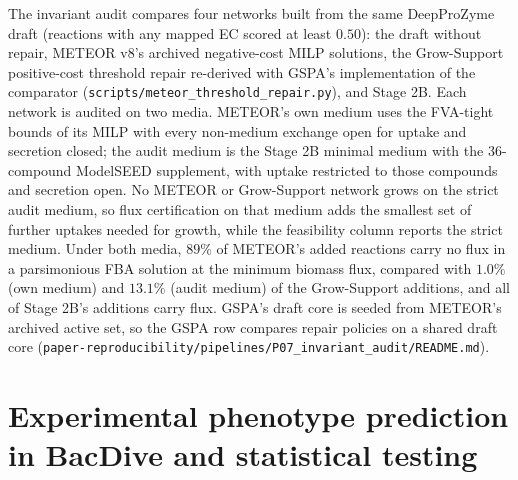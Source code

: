\documentclass[10pt]{article}
\newcommand{\fn}[1]{\nolinkurl{#1}}
\begin{document}
The invariant audit compares four networks built from the same DeepProZyme draft (reactions with any mapped EC scored at least $0.50$): the draft without repair, METEOR v8's archived negative-cost MILP solutions, the Grow-Support positive-cost threshold repair re-derived with GSPA's implementation of the comparator (\fn{scripts/meteor\_threshold\_repair.py}), and Stage 2B. Each network is audited on two media. METEOR's own medium uses the FVA-tight bounds of its MILP with every non-medium exchange open for uptake and secretion closed; the audit medium is the Stage 2B minimal medium with the 36-compound ModelSEED supplement, with uptake restricted to those compounds and secretion open. No METEOR or Grow-Support network grows on the strict audit medium, so flux certification on that medium adds the smallest set of further uptakes needed for growth, while the feasibility column reports the strict medium. Under both media, $89\%$ of METEOR's added reactions carry no flux in a parsimonious FBA solution at the minimum biomass flux, compared with $1.0\%$ (own medium) and $13.1\%$ (audit medium) of the Grow-Support additions, and all of Stage 2B's additions carry flux. GSPA's draft core is seeded from METEOR's archived active set, so the GSPA row compares repair policies on a shared draft core (\fn{paper-reproducibility/pipelines/P07_invariant_audit/README.md}).







\section{Experimental phenotype prediction in BacDive and statistical testing}
\label{sec:supp_bacdive}
\end{document}
